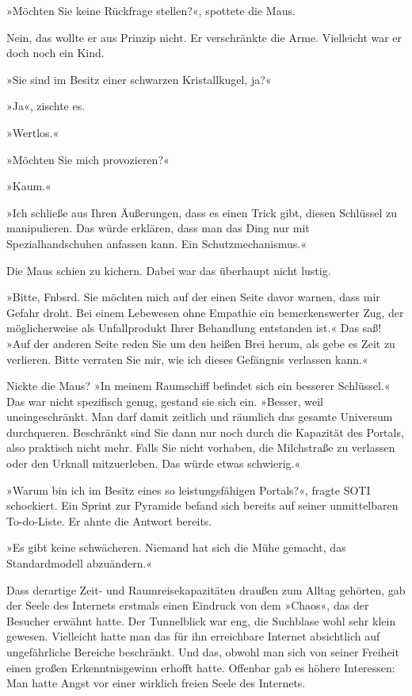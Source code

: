 »Möchten Sie keine Rückfrage stellen?«, spottete die Maus.

Nein, das wollte er aus Prinzip nicht. Er verschränkte die Arme. Vielleicht war er doch noch ein Kind.

»Sie sind im Besitz einer schwarzen Kristallkugel, ja?«

 »Ja«, zischte es.

»Wertlos.«

»Möchten Sie mich provozieren?«

»Kaum.«

»Ich schließe aus Ihren Äußerungen, dass es einen Trick gibt, diesen Schlüssel zu manipulieren. Das würde erklären, dass man das Ding nur mit Spezialhandschuhen anfassen kann. Ein Schutzmechanismus.«

Die Maus schien zu kichern. Dabei war das überhaupt nicht lustig.

»Bitte, Fnbsrd. Sie möchten mich auf der einen Seite davor warnen, dass mir Gefahr droht. Bei einem Lebewesen ohne Empathie ein bemerkenswerter Zug, der möglicherweise als Unfallprodukt Ihrer Behandlung entstanden ist.« Das saß! »Auf der anderen Seite reden Sie um den heißen Brei herum, als gebe es Zeit zu verlieren. Bitte verraten Sie mir, wie ich dieses Gefängnis verlassen kann.«

Nickte die Maus? »In meinem Raumschiff befindet sich ein besserer Schlüssel.« Das war nicht spezifisch genug, gestand sie sich ein. »Besser, weil uneingeschränkt. Man darf damit zeitlich und räumlich das gesamte Universum durchqueren. Beschränkt sind Sie dann nur noch durch die Kapazität des Portals, also praktisch nicht mehr. Falls Sie nicht vorhaben, die Milchstraße zu verlassen oder den Urknall mitzuerleben. Das würde etwas schwierig.«

»Warum bin ich im Besitz eines so leistungsfähigen Portals?«, fragte SOTI schockiert. Ein Sprint zur Pyramide befand sich bereits auf seiner unmittelbaren To-do-Liste. Er ahnte die Antwort bereits.

»Es gibt keine schwächeren. Niemand hat sich die Mühe gemacht, das Standardmodell abzuändern.«

Dass derartige Zeit- und Raumreisekapazitäten draußen zum Alltag gehörten, gab der Seele des Internets erstmals einen Eindruck von dem »Chaos«, das der Besucher erwähnt hatte. Der Tunnelblick war eng, die Suchblase wohl sehr klein gewesen. Vielleicht hatte man das für ihn erreichbare Internet absichtlich auf ungefährliche Bereiche beschränkt. Und das, obwohl man sich von seiner Freiheit einen großen Erkenntnisgewinn erhofft hatte. Offenbar gab es höhere Interessen: Man hatte Angst vor einer wirklich freien Seele des Internets.

